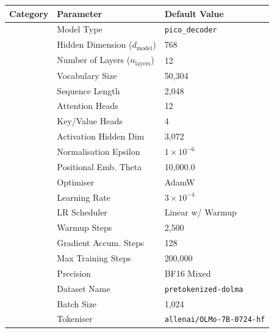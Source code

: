 \begin{table}[h!]
    \centering
    \renewcommand{\arraystretch}{1.2} %
    \setlength{\tabcolsep}{8pt} %
    \footnotesize
    \begin{tabular}{|>{\centering\arraybackslash}p{3cm}|p{5cm}|p{5.5cm}|}
        \hline
        \textbf{Category} & \textbf{Parameter} & \textbf{Default Value} \\
        \hline
        \multirow{10}{*}{\textbf{Model}}  
            & Model Type & \texttt{pico\_decoder} \\
            & Hidden Dimension ($d_{\text{model}}$) & 768 \\
            & Number of Layers ($n_{\text{layers}}$) & 12 \\
            & Vocabulary Size & 50,304 \\
            & Sequence Length & 2,048 \\
            & Attention Heads & 12 \\
            & Key/Value Heads & 4 \\
            & Activation Hidden Dim & 3,072 \\
            & Normalisation Epsilon & $1 \times 10^{-6}$ \\
            & Positional Emb. Theta & 10,000.0 \\
        \hline
        \multirow{7}{*}{\textbf{Training}}  
            & Optimiser & AdamW \\
            & Learning Rate & $3 \times 10^{-4}$ \\
            & LR Scheduler & Linear w/ Warmup \\
            & Warmup Steps & 2,500 \\
            & Gradient Accum. Steps & 128 \\
            & Max Training Steps & 200,000 \\
            & Precision & BF16 Mixed \\
        \hline
        \multirow{3}{*}{\textbf{Data}}  
            & Dataset Name & \texttt{pretokenized-dolma} \\
            & Batch Size & 1,024 \\
            & Tokeniser & \texttt{allenai/OLMo-7B-0724-hf} \\

\end{tabular}
\end{table}
